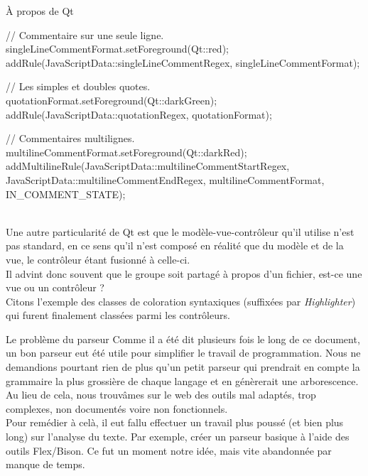 \documentclass[a4paper, 12pt]{report}
\begin{document}
\begin{chapter}
\begin{section}{À propos de Qt}
\begin{center}
\begin{cppcode}
{    // Commentaire sur une seule ligne.
    singleLineCommentFormat.setForeground(Qt::red);
    addRule(JavaScriptData::singleLineCommentRegex, singleLineCommentFormat);

    // Les simples et doubles quotes.
    quotationFormat.setForeground(Qt::darkGreen);
    addRule(JavaScriptData::quotationRegex, quotationFormat);

    // Commentaires multilignes.
    multilineCommentFormat.setForeground(Qt::darkRed);
    addMultilineRule(JavaScriptData::multilineCommentStartRegex,
                     JavaScriptData::multilineCommentEndRegex,
                     multilineCommentFormat,
                     IN_COMMENT_STATE);
}
			\end{cppcode}
			\end{center}~\\


			Une autre particularité de \gls{Qt} est que le modèle-vue-contrôleur qu'il utilise n'est pas standard, en ce sens qu'il n'est composé
			en réalité que du modèle et de la vue, le contrôleur étant fusionné à celle-ci.\\
			Il advint donc souvent que le groupe soit partagé à propos d'un fichier, est-ce une vue ou un contrôleur ? \\
			Citons l'exemple des classes de coloration syntaxiques (suffixées par \emph{Highlighter}) qui furent finalement classées parmi les
			contrôleurs.
	\end{section}

	\begin{section}{Le problème du parseur}
		Comme il a été dit plusieurs fois le long de ce document, un bon \gls{parseur} eut été utile pour simplifier le travail de programmation.
		Nous ne demandions pourtant rien de plus qu'un petit \gls{parseur} qui prendrait en compte la grammaire la plus grossière de chaque langage
		et en génèrerait une arborescence. Au lieu de cela, nous trouvâmes sur le web des outils mal adaptés, trop complexes, non documentés voire
		non fonctionnels.\\

		Pour remédier à celà, il eut fallu effectuer un travail plus poussé (et bien plus long) sur l'analyse du texte. Par exemple, créer un 
		\gls{parseur} basique à l'aide des outils \gls{Flex}/\gls{Bison}. Ce fut un moment notre idée, mais vite abandonnée par manque de temps.
	\end{section}


\end{chapter}
\end{document}
